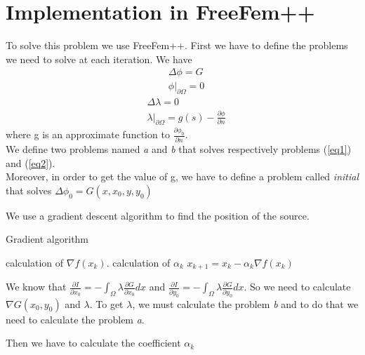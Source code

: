 
\section{Implementation in FreeFem++}
To solve this problem we use FreeFem++. First we have to define the problems we need to solve at each iteration. 
We have 
\begin{align}\label{eq1}
& \Delta \phi = G \\
& \left. \phi\right|_{\partial\Omega} = 0\nonumber
\end{align}
\begin{align}\label{eq2}
& \Delta \lambda = 0 \\
& \left. \lambda\right|_{\partial\Omega} = g(s)-\frac{\partial \phi}{\partial n}\nonumber
\end{align}
where g is an approximate function to $\frac{\partial \phi_0}{\partial n}$. \\
We define two problems named \textit{a} and \textit{b} that solves respectively problems (\ref{eq1}) and (\ref{eq2}).\\
Moreover, in order to get the value of g, we have to define a problem called \textit{initial} that solves $\Delta \phi_0 = G(x,x_0,y,y_0)$


We use a gradient descent algorithm to find the position of the source.\\
\begin{algorithm}
\caption{Gradient algorithm}
\begin{algorithmic} 
\STATE calculation of $\nabla f(x_k)$.
\STATE calculation of $\alpha_k$
\STATE $x_{k+1} = x_k - \alpha_k \nabla f(x_k)$
\ENDWHILE
\end{algorithmic}
\end{algorithm}

We know that $\frac{\partial I}{\partial x_0} = -\int_{\Omega}\lambda \frac{\partial G}{\partial x_0} dx$ and $\frac{\partial I}{\partial y_0} = -\int_{\Omega}\lambda \frac{\partial G}{\partial y_0} dx$. So we need to calculate $\nabla G(x_0,y_0)$ and $\lambda$. To get $\lambda$, we must calculate the problem \textit{b} and to do that we need to calculate the problem \textit{a}.

Then we have to calculate the coefficient $\alpha_k$

